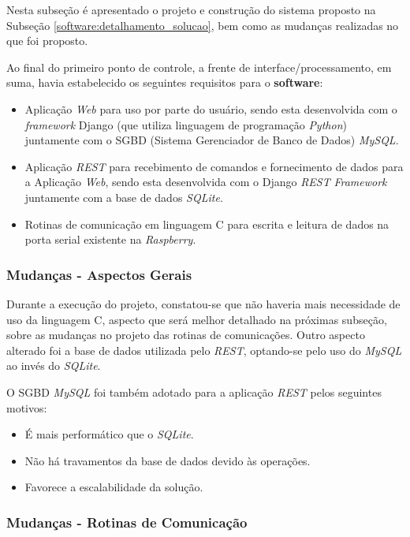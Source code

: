 Nesta subseção é apresentado o projeto e construção do sistema proposto na Subseção \ref{software:detalhamento_solucao}, bem como as mudanças realizadas no que foi proposto.

Ao final do primeiro ponto de controle, a frente de interface/processamento, em suma, havia estabelecido os seguintes requisitos para o \textbf{software}:

\begin{itemize}
    \item Aplicação \textit{Web} para uso por parte do usuário, sendo esta desenvolvida com o \textit{framework} Django (que utiliza linguagem de programação \textit{Python}) juntamente com o SGBD (Sistema Gerenciador de Banco de Dados) \textit{MySQL}.
    \item Aplicação \textit{REST} para recebimento de comandos e fornecimento de dados para a Aplicação \textit{Web}, sendo esta desenvolvida com o Django \textit{REST} \textit{Framework} juntamente com a base de dados \textit{SQLite}.
    \item Rotinas de comunicação em linguagem C para escrita e leitura de dados na porta serial existente na \textit{Raspberry}.
\end{itemize}

\subsubsection*{\textbf{Mudanças - Aspectos Gerais}}

Durante a execução do projeto, constatou-se que não haveria mais necessidade de uso da linguagem C, aspecto que será melhor detalhado na próximas subseção, sobre as mudanças no projeto das rotinas de comunicações. Outro aspecto alterado foi a base de dados utilizada pelo \textit{REST}, optando-se pelo uso do \textit{MySQL} ao invés do \textit{SQLite}.

O SGBD \textit{MySQL} foi também adotado para a aplicação \textit{REST} pelos seguintes motivos:

\begin{itemize}
    \item É mais performático que o \textit{SQLite}.
    \item Não há travamentos da base de dados devido às operações.
    \item Favorece a escalabilidade da solução.
\end{itemize}

\subsubsection*{\textbf{Mudanças - Rotinas de Comunicação}}

